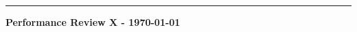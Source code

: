 \documentclass[10pt, a4paper]{article} %
\begin{document}
\textbf{\huge{%
}} 
\vspace{-10pt}
\rule{\columnwidth}{1pt}  %

\textbf{Performance Review X - \today} %

\end{document}
